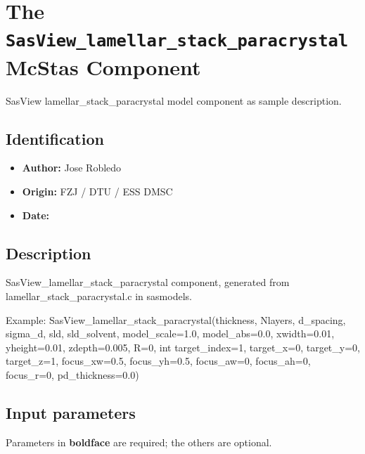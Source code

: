 \section{The \texttt{SasView\_lamellar\_stack\_paracrystal} McStas Component}
SasView lamellar\_stack\_paracrystal model component as sample description.

\subsection*{Identification}
\begin{itemize}
  \item \textbf{Author:} Jose Robledo
  \item \textbf{Origin:} FZJ / DTU / ESS DMSC
  \item \textbf{Date:} 
\end{itemize}

\subsection*{Description}
SasView\_lamellar\_stack\_paracrystal component, generated from lamellar\_stack\_paracrystal.c in sasmodels.

Example: SasView\_lamellar\_stack\_paracrystal(thickness, Nlayers, d\_spacing, sigma\_d, sld, sld\_solvent, model\_scale=1.0, model\_abs=0.0, xwidth=0.01, yheight=0.01, zdepth=0.005, R=0, int target\_index=1, target\_x=0, target\_y=0, target\_z=1, focus\_xw=0.5, focus\_yh=0.5, focus\_aw=0, focus\_ah=0, focus\_r=0, pd\_thickness=0.0)

\subsection*{Input parameters}
Parameters in \textbf{boldface} are required; the others are optional.

